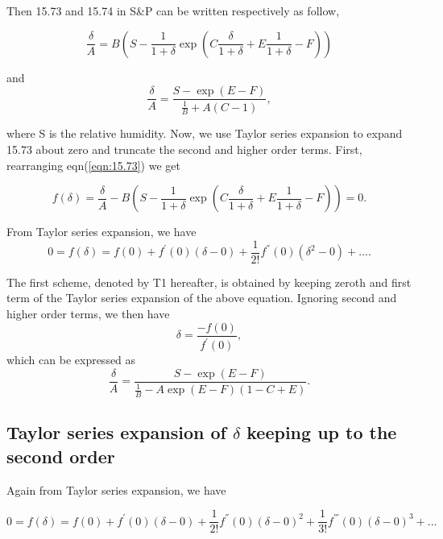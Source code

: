 \documentclass[12pt]{article}
\begin{document}
{Then 15.73 and 15.74 in S\&P can be written respectively as follow,

\begin{equation}\label{eqn:15.73}
\frac{\delta}{A}=B(S-\frac{1}{1+\delta}\exp(C\frac{\delta}{1+\delta}+E \frac{1}{1+\delta}-F))
\end{equation}

and 
\begin{equation}\label{eqn:15.74}
\frac{\delta}{A}=\frac{S-\exp(E-F)}{\frac{1}{B}+A(C-1)},
\end{equation}

where S is the relative humidity. Now, we use Taylor series expansion to expand 15.73 about zero and truncate the second and higher order terms. First, rearranging  eqn(\ref{eqn:15.73}) we get

\begin{equation}\label{eqn:26}
f(\delta)=\frac{\delta}{A}-B(S-\frac{1}{1+\delta}\exp(C\frac{\delta}{1+\delta}+E \frac{1}{1+\delta}-F))=0.
\end{equation}


From Taylor series expansion, we have
\begin{equation}\label{eqn:27}
0=f(\delta)=f(0)+f^{'}(0)(\delta-0)+\frac{1}{2!}f^{''}(0)(\delta^{2}-0)+....
\end{equation}

The first scheme, denoted by T1 hereafter, is obtained by keeping zeroth and first term of the Taylor series expansion of the above equation. Ignoring second and higher order terms, we then have
\begin{equation}\label{eqn:28}
\delta=\frac{-f(0)}{f^{'}(0)},
\end{equation}
which can be expressed as
\begin{equation}\label{eqn:29}
\frac{\delta}{A}=\frac{S-\exp(E-F)}{\frac{1}{B}-A \exp(E-F) (1-C+E)}.
\end{equation}

\subsection{Taylor series expansion of $\delta$ keeping up to the second order}

Again from Taylor series expansion, we have

\begin{equation}\label{eqn:30}
0=f(\delta)=f(0)+f^{'}(0)(\delta-0)+\frac{1}{2!}f^{''}(0)(\delta-0)^{2}+ \frac{1}{3!} f^{'''}(0)(\delta-0)^{3}+...
\end{equation}

}
\end{document}
